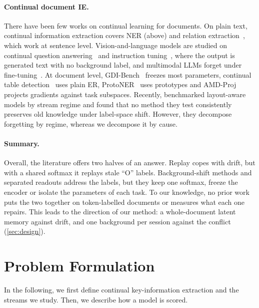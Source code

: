 \documentclass[10pt,twocolumn,letterpaper]{article}
\begin{document}
\paragraph{Continual document IE.} There have been few works on continual learning for documents. On plain text, continual information extraction covers NER (above) and relation extraction~\citep{han2020emar,cui2021rpcre,zhao2022crl}, which work at sentence level. Vision-and-language models are studied on continual question answering~\citep{srinivasan2022climb,zhang2025clcrossvqa} and instruction tuning~\citep{chen2024sefe,ge2025dmole}, where the output is generated text with no background label, and multimodal LLMs forget under fine-tuning~\citep{zhai2023investigating}. At document level, GDI-Bench~\citep{gdibench} freezes most parameters, continual table detection~\citep{minouei2022table} uses plain ER, ProtoNER~\citep{kumar2023protoner} uses prototypes and AMD-Proj~\citep{sassioui2026amdproj} projects gradients against task subspaces. Recently, \citet{sassioui2026documents} benchmarked layout-aware models by stream regime and found that no method they test consistently preserves old knowledge under label-space shift. However, they decompose forgetting by regime, whereas we decompose it by cause.

\paragraph{Summary.} Overall, the literature offers two halves of an answer. Replay copes with drift, but with a shared softmax it replays stale ``O'' labels. Background-shift methods and separated readouts address the labels, but they keep one softmax, freeze the encoder or isolate the parameters of each task. To our knowledge, no prior work puts the two together on token-labelled documents or measures what each one repairs. This leads to the direction of our method: a whole-document latent memory against drift, and one background per session against the conflict (\cref{sec:design}).

\section{Problem Formulation}
\label{sec:setup}
In the following, we first define continual key-information extraction and the streams we study. Then, we describe how a model is scored.
\end{document}
